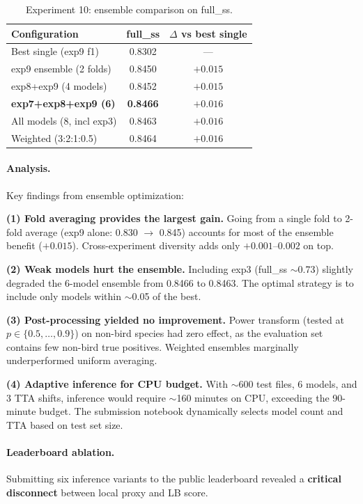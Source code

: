 \begin{table}[h]
\centering
\caption{Experiment 10: ensemble comparison on full\_ss.}
\label{tab:exp10}
\begin{tabular}{lcc}
\hline
\textbf{Configuration} & \textbf{full\_ss} & \textbf{$\Delta$ vs best single} \\
\hline
Best single (exp9 f1)        & 0.8302 & --- \\
exp9 ensemble (2 folds)      & 0.8450 & $+0.015$ \\
exp8+exp9 (4 models)         & 0.8452 & $+0.015$ \\
\textbf{exp7+exp8+exp9 (6)}  & \textbf{0.8466} & $+\mathbf{0.016}$ \\
All models (8, incl exp3)    & 0.8463 & $+0.016$ \\
Weighted (3:2:1:0.5)         & 0.8464 & $+0.016$ \\
\hline
\end{tabular}
\end{table}

\paragraph{Analysis.}
Key findings from ensemble optimization:

\textbf{(1) Fold averaging provides the largest gain.}
Going from a single fold to 2-fold average (exp9 alone: 0.830 $\to$ 0.845)
accounts for most of the ensemble benefit ($+0.015$). Cross-experiment
diversity adds only $+0.001$--$0.002$ on top.

\textbf{(2) Weak models hurt the ensemble.}
Including exp3 (full\_ss $\sim$0.73) slightly degraded the 6-model ensemble
from 0.8466 to 0.8463. The optimal strategy is to include only models within
$\sim$0.05 of the best.

\textbf{(3) Post-processing yielded no improvement.}
Power transform (tested at $p \in \{0.5, \ldots, 0.9\}$) on non-bird species
had zero effect, as the evaluation set contains few non-bird true positives.
Weighted ensembles marginally underperformed uniform averaging.

\textbf{(4) Adaptive inference for CPU budget.}
With $\sim$600 test files, 6 models, and 3 TTA shifts, inference would require
$\sim$160 minutes on CPU, exceeding the 90-minute budget. The submission
notebook dynamically selects model count and TTA based on test set size.

\paragraph{Leaderboard ablation.}
Submitting six inference variants to the public leaderboard revealed a
\textbf{critical disconnect} between local proxy and LB score.

